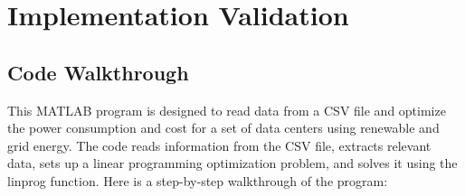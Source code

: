 \documentclass[12pt, titlepage]{article}
\begin{document}

\newpage
\section{Implementation Validation}
\subsection{Code Walkthrough}

This MATLAB program is designed to read data from a CSV file and optimize the power consumption and cost for a set of data centers using renewable and grid energy. The code reads information from the CSV file, extracts relevant data, sets up a linear programming optimization problem, and solves it using the linprog function. Here is a step-by-step walkthrough of the program:
\end{document}
